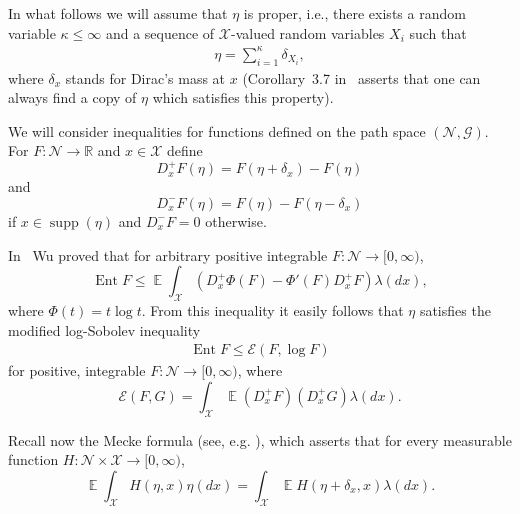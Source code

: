 \documentclass[a4paper]{amsart}
\theoremstyle{definition}
\theoremstyle{remark}
\numberwithin{equation}{section}
\newcommand*{\RR}{\mathbb{R}}
\DeclareMathOperator{\EE}{\mathbb{E}} %
\newcommand*{\calE}{\mathcal{E}}
\DeclareMathOperator{\Ent}{Ent}	%
\DeclareMathOperator{\supp}{supp}
\begin{document}
In what follows we will assume that $\eta$ is proper, i.e., there exists a random variable $\kappa \le \infty$ and a sequence of $\mathcal{X}$-valued random variables $X_i$ such that
\begin{align}\label{eq:Poisson-proper}
  \eta = \sum_{i=1}^\kappa \delta_{X_i},
\end{align}
where $\delta_x$ stands for Dirac's mass at $x$ (Corollary~3.7 in~\cite{MR3791470} asserts that one can always find a copy of $\eta$ which satisfies this property).

We will consider inequalities for functions defined on the path space $(\mathcal{N}, \mathcal{G})$.
For $F\colon \mathcal{N} \to \RR$ and $x \in \mathcal{X}$ define
\begin{displaymath}
 D_x^+ F(\eta) = F(\eta + \delta_x) - F(\eta)
\end{displaymath}
and
\begin{displaymath}
  D_x^- F(\eta) = F(\eta) - F(\eta - \delta_x)
\end{displaymath}
if $x \in \supp(\eta)$ and $D_x^- F = 0$ otherwise.

In~\cite{MR1800540} Wu proved that for arbitrary positive integrable $F\colon \mathcal{N}\to [0, \infty)$,
\begin{equation}\label{eq:Wu}
  \Ent F \le \EE \int_\mathcal{X} (D_x^+ \Phi(F) - \Phi'(F) D_x^+ F)\lambda(dx),
\end{equation}
where $\Phi(t) = t\log t$. From this inequality it easily follows that $\eta$ satisfies the modified log-Sobolev inequality
\begin{align}\label{eq:mLSI-Poisson}
\Ent F \le \calE (F, \log F)
\end{align}
for positive, integrable $F\colon \mathcal{N}\to [0, \infty)$, where
\begin{displaymath}
  \calE(F,G) = \int_\mathcal{X}\EE (D^+_x F)(D^+_x G)\lambda(dx).
\end{displaymath}

Recall now the Mecke formula (see, e.g. \cite[Theorem 4.1]{MR3791470}), which asserts that for every measurable function  $H\colon \mathcal{N}\times\mathcal{X} \to [0,\infty)$,
\begin{equation}\label{eq:Mecke}
  \EE \int_\mathcal{X} H(\eta,x)\eta(dx) = \int_\mathcal{X} \EE H(\eta+\delta_x,x)\lambda(dx).
\end{equation}
\end{document}
